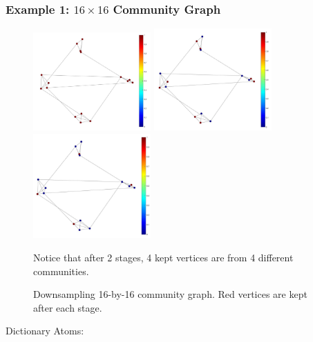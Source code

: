 \documentclass[a4paper]{article}
\begin{document}
\subsubsection{Example 1: $16 \times 16$ Community Graph}

\begin{figure}[h]
\centering
\includegraphics[width=4.5cm,keepaspectratio]{graph} \includegraphics[width=4.5cm,keepaspectratio]{downsample_stage_1} \includegraphics[width=4.5cm,keepaspectratio]{downsample_stage_2}

\caption{\label{fig:Community Graph} Downsampling 16-by-16 community graph. Red vertices are kept after each stage.} {Notice that after 2 stages, 4 kept vertices are from 4 different communities.}
\end{figure}

Dictionary Atoms:
\end{document}
